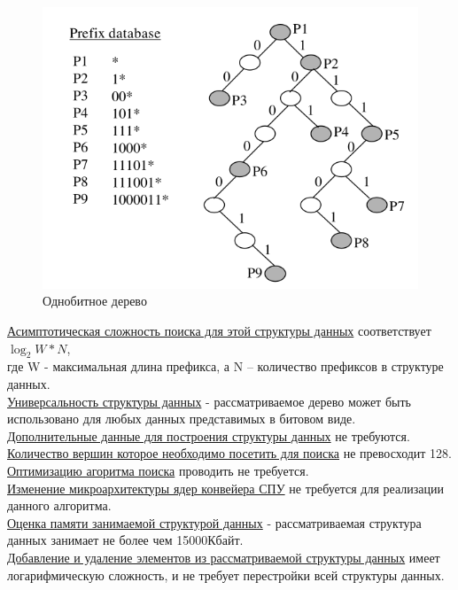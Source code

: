 \documentclass[a4peper, 12pt, titlepage, finall]{extreport}
\begin{document}
            \begin{figure}[h]      
                \includegraphics[width=\textwidth]{one_bit_tree.png}
                \caption{Однобитное дерево}
                \label{fig:mesh1}
            \end{figure}

            \underline{Асимптотическая сложность поиска для этой структуры данных} соответствует {\ttfamily $\log_2{W*N}$},\\
            где {\ttfamily W} - максимальная длина префикса, а {\ttfamily N} -- количество префиксов в структуре данных.\\
            \underline{Универсальность структуры данных} - рассматриваемое дерево может быть использовано для любых данных представимых в битовом виде.\\
            \underline{Дополнительные данные для построения структуры данных} не требуются.\\
            \underline{Количество вершин которое необходимо посетить для поиска} не превосходит 128.\\
            \underline{Оптимизацию агоритма поиска} проводить не требуется.\\
            \underline{Изменение микроархитектуры ядер конвейера СПУ} не требуется для реализации данного алгоритма.\\
            \underline{Оценка памяти занимаемой структурой данных} - рассматриваемая структура данных занимает не более чем 15000Кбайт.\\
            \underline{Добавление и удаление элементов из рассматриваемой структуры данных} имеет логарифмическую сложность, и не требует перестройки всей структуры данных.\\
\end{document}

